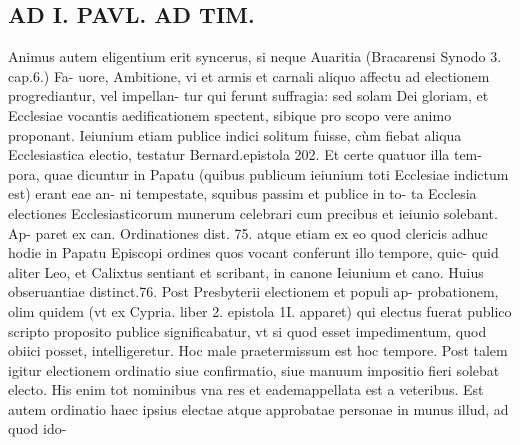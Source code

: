 \documentclass{article}
\begin{document}
\begin{pages}
\section*{AD I. PAVL. AD TIM. }
\marginpar{[ p.339 ]}\pstart Animus autem eligentium erit syncerus, si neque Auaritia (Bracarensi Synodo 3. cap.6.) Fa- uore, Ambitione, vi et armis et carnali aliquo affectu ad electionem progrediantur, vel impellan- tur qui ferunt suffragia: sed solam Dei gloriam, et Ecclesiae vocantis aedificationem spectent, sibique  pro scopo vere animo proponant.  \pend\pstart Ieiunium etiam publice indici solitum fuisse, cùm fiebat aliqua Ecclesiastica electio, testatur Bernard.epistola 202. Et certe quatuor illa tem- pora, quae dicuntur in Papatu (quibus publicum ieiunium toti Ecclesiae indictum est) erant eae an- ni tempestate, squibus passim et publice in to- ta Ecclesia electiones Ecclesiasticorum munerum celebrari cum precibus et ieiunio solebant. Ap- paret ex can. Ordinationes dist. 75. atque  etiam ex eo quod clericis adhuc hodie in Papatu Episcopi ordines quos vocant conferunt illo tempore, quic- quid aliter Leo, et Calixtus sentiant et scribant, in canone Ieiunium et cano. Huius obseruantiae distinct.76.  \pend\pstart Post Presbyterii electionem et populi ap- probationem, olim quidem (vt ex Cypria. liber 2. epistola 1I. apparet) qui electus fuerat publico scripto proposito publice significabatur, vt si quod esset impedimentum, quod obiici posset, intelligeretur. Hoc male praetermissum est hoc tempore. Post talem igitur electionem ordinatio siue confirmatio, siue manuum impositio fieri solebat electo. His enim tot nominibus vna res et eademappellata est a veteribus.  \pend\pstart Est autem ordinatio haec ipsius electae atque approbatae personae in munus illud, ad quod ido-  \pend

\end{pages}
\end{document}
